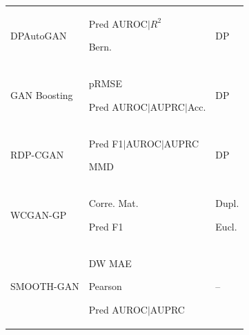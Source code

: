 \begin{landscape}
\begin{table}[htbp]
\begin{tabular}{p{26mm} p{84mm} p{60mm}}
DPAutoGAN & \begin{enumerate*} \item Pred AUROC$\vert$$R^2$  \item Bern. \end{enumerate*}	
 &	DP \\
GAN Boosting & \begin{enumerate*} \item pRMSE \item Pred AUROC$\vert$AUPRC$\vert$Acc. \end{enumerate*}	
	& DP \\
RDP-CGAN & \begin{enumerate*} \item Pred F1$\vert$AUROC$\vert$AUPRC \item MMD  \end{enumerate*}	
	& DP \\
WCGAN-GP & \begin{enumerate*} \item Corre. Mat.
 \item Pred F1  \end{enumerate*} & \begin{enumerate*} \item Dupl.
\item Eucl. \end{enumerate*} \\
SMOOTH-GAN & \begin{enumerate*} \item DW MAE \item Pearson  \item Pred AUROC$\vert$AUPRC \end{enumerate*}	
	& -- \\
\hline

\end{tabular}
\end{table}
\end{landscape}



